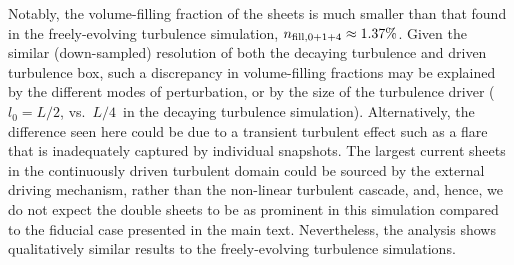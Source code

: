 Notably, the volume-filling fraction of the sheets is much smaller than that found in the freely-evolving turbulence simulation, $n_{\rm fill,0+1+4} \approx 1.37\%$.
Given the similar (down-sampled) resolution of both the decaying turbulence and driven turbulence box, such a discrepancy in volume-filling fractions may be explained by the different modes of perturbation, or by the size of the turbulence driver ($l_0 = L/2$, vs.\ $L/4$\ in the decaying turbulence simulation).
Alternatively, the difference seen here could be due to a transient turbulent effect such as a flare that is inadequately captured by individual snapshots.
The largest current sheets in the continuously driven turbulent domain could be sourced by the external driving mechanism, rather than the non-linear turbulent cascade, and, hence, we do not expect the double sheets to be as prominent in this simulation compared to the fiducial case presented in the main text.
Nevertheless, the analysis shows qualitatively similar results to the freely-evolving turbulence simulations.
